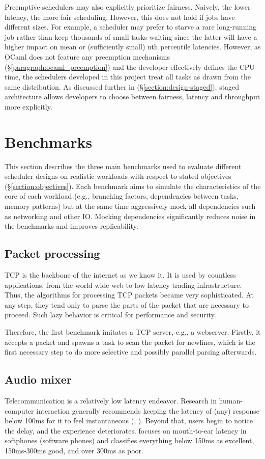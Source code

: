 \documentclass[12pt,a4paper,twoside]{report}
\begin{document}
Preemptive schedulers may also explicitly prioritize fairness. Naively, the lower latency, the more fair scheduling. However, this does not hold if jobs have different sizes. For example, a scheduler may prefer to starve a rare long-running job rather than keep thousands of small tasks waiting since the latter will have a higher impact on mean or (sufficiently small) nth percentile latencies. However, as OCaml does not feature any preemption mechanisms (\S\ref{paragraph:ocaml_preemption}) and the developer effectively defines the CPU time, the schedulers developed in this project treat all tasks as drawn from the same distribution. As discussed further in (\S\ref{section:design-staged}), staged architecture allows developers to choose between fairness, latency and throughput more explicitly. 


\section{Benchmarks}
This section describes the three main benchmarks used to evaluate different scheduler designs on realistic workloads with respect to stated objectives (\S\ref{section:objectives}). Each benchmark aims to simulate the characteristics of the core of each workload (e.g., branching factors, dependencies between tasks, memory patterns) but at the same time aggressively mock all dependencies such as networking and other IO. Mocking dependencies significantly reduces noise in the benchmarks and improves replicability. 

\subsection{Packet processing}
\label{section:background_packet-processing}
TCP is the backbone of the internet as we know it. It is used by countless applications, from the world wide web to low-latency trading infrastructure. Thus, the algorithms for processing TCP packets became very sophisticated. At any step, they tend only to parse the parts of the packet that are necessary to proceed. Such lazy behavior is critical for performance and security.

Therefore, the first benchmark imitates a TCP server, e.g., a webserver. Firstly, it accepts a packet and spawns a task to scan the packet for newlines, which is the first necessary step to do more selective and possibly parallel parsing afterwards. 

\subsection{Audio mixer}
\label{section:bench-audio-mixer}
Telecommunication is a relatively low latency endeavor. Research in human-computer interaction generally recommends keeping the latency of (any) response below 100ms for it to feel instantaneous (\cite{Miller1968}, \cite{Amin2013}). Beyond that, users begin to notice the delay, and the experience deteriorates. \cite{voip-latency} focuses on mouth-to-ear latency in softphones (software phones) and classifies everything below 150ms as excellent, 150ms-300ms good, and over 300ms as poor. 
\end{document}
